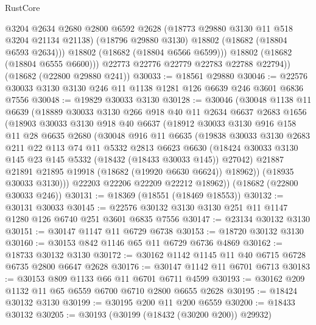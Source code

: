 \begin{lexlean}{RustCore}
\begin{coremodule}
              @3204
              @2634
              @2680
              @2800
              @6592
              @2628
              (@18773 @29880 @3130 @11 @518 @3204 @21134 @21138)
              (@18796 @29880 @3130)
              @18802
              (@18682 (@18804 @6593 @2634)))
            @18802
            (@18682 (@18804 @6566 @6599)))
          @18802
          (@18682 (@18804 @6555 @6600)))
        @22773
        @22776
        @22779
        @22783
        @22788
        @22794))
    (@18682 (@22800 @29880 @241))
@30033 := @18561 @29880
@30046 := @22576 @30033 @3130 @3130 @246 @11 @1138 @1281 @126 @6639 @246 @3601 @6836 @7556
@30048 := @19829 @30033 @3130
@30128 := @30046
    (@30048
      @1138
      @11
      @6639
      (@18889
        @30033
        @3130
        @266
        @918
        @40
        @11
        @2634
        @6637
        @2683
        @1656
        (@18903
          @30033
          @3130
          @918
          @40
          @6637
          (@18912
            @30033
            @3130
            @916
            @158
            @11
            @28
            @6635
            @2680
            (@30048
              @916
              @11
              @6635
              (@19838
                @30033
                @3130
                @2683
                @211
                @22
                @113
                @74
                @11
                @5332
                @2813
                @6623
                @6630
                (@18424 @30033 @3130 @145 @23 @145 @5332 (@18432 (@18433 @30033 @145)) @27042)
                @21887
                @21891
                @21895
                @19918
                (@18682 (@19920 @6630 @6624))
                @18962))
            (@18935 @30033 @3130)))
        @22203
        @22206
        @22209
        @22212
        @18962))
    (@18682 (@22800 @30033 @246))
@30131 := @18369 (@18551 (@18469 @18553))
@30132 := @30131 @30033
@30145 := @22576 @30132 @3130 @3130 @251 @11 @1147 @1280 @126 @6740 @251 @3601 @6835 @7556
@30147 := @23134 @30132 @3130
@30151 := @30147 @1147 @11 @6729 @6738
@30153 := @18720 @30132 @3130
@30160 := @30153 @842 @1146 @65 @11 @6729 @6736 @4869
@30162 := @18733 @30132 @3130
@30172 := @30162 @1142 @1145 @11 @40 @6715 @6728 @6735 @2800 @6647 @2628
@30176 := @30147 @1142 @11 @6701 @6713
@30183 := @30153 @809 @1133 @66 @11 @6701 @6711 @4599
@30193 := @30162 @209 @1132 @11 @65 @6559 @6700 @6710 @2800 @6655 @2628
@30195 := @18424 @30132 @3130
@30199 := @30195 @200 @11 @200 @6559
@30200 := @18433 @30132
@30205 := @30193 (@30199 (@18432 (@30200 @200)) @29932)

\end{coremodule}
\end{lexlean}
